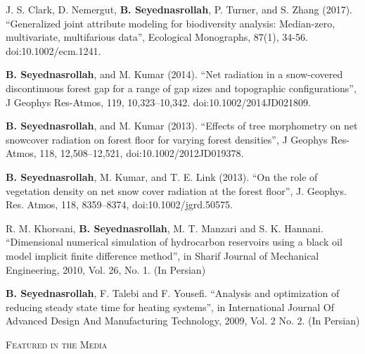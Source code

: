 \documentclass[10pt]{article}
\newenvironment{changemargin}[2]{%
  \begin{list}{}{%
    \setlength{\topsep}{0pt}%
    \setlength{\leftmargin}{#1}%
    \setlength{\rightmargin}{#2}%
    \setlength{\listparindent}{\parindent}%
    \setlength{\itemindent}{\parindent}%
    \setlength{\parsep}{\parskip}%
  }%
  \item[]}{\end{list}
}
\newcommand{\lineover}{
	\begin{changemargin}{-0.05in}{-0.05in}
		\vspace*{-8pt}
		\hrulefill \\
		\vspace*{-2pt}
	\end{changemargin}
}
\newcommand{\header}[1]{
	\begin{changemargin}{-0.5in}{-0.5in}
		\scshape{#1}\\
  	\lineover
	\end{changemargin}
}
\newenvironment{body} {
	\vspace*{-2pt}
	\begin{changemargin}{-0.5in}{-0.5in}
  }
	{\end{changemargin}
}
\begin{document}
\begin{body}
	J. S. Clark, D. Nemergut, \textbf{B. Seyednasrollah}, P. Turner, and S. Zhang (2017). ``Generalized joint attribute modeling for biodiversity analysis: Median-zero, multivariate, multifarious data'', Ecological Monographs, 87(1), 34-56. doi:10.1002/ecm.1241.\\
\medskip

	\textbf{B. Seyednasrollah}, and M. Kumar (2014). ``Net radiation in a snow-covered discontinuous forest gap for a range of gap sizes and topographic configurations'', J Geophys Res-Atmos, 119, 10,323–10,342. doi:10.1002/2014JD021809. \\
\medskip

	\textbf{B. Seyednasrollah}, and M. Kumar (2013). ``Effects of tree morphometry on net snowcover radiation on forest floor for varying forest densities'', J Geophys Res-Atmos, 118, 12,508–12,521, doi:10.1002/2012JD019378.\\
\medskip

	\textbf{B. Seyednasrollah}, M. Kumar, and T. E. Link (2013). ``On the role of vegetation density on net snow cover radiation at the forest floor'', J. Geophys. Res. Atmos, 118, 8359–8374, doi:10.1002/jgrd.50575.\\
\medskip

R. M. Khorsani, \textbf{B. Seyednasrollah}, M. T. Manzari and S. K. Hannani. ``Dimensional numerical simulation of hydrocarbon reservoirs using a black oil model implicit finite difference method'', in Sharif Journal of Mechanical Engineering, 2010, Vol. 26, No. 1. (In Persian)\\
\medskip

	 \textbf{B. Seyednasrollah}, F. Talebi and F. Yousefi. ``Analysis and optimization of reducing steady state time for heating systems'', in International Journal Of Advanced Design And Manufacturing Technology, 2009, Vol. 2 No. 2.  (In Persian)\\
\medskip


\end{body}

\medskip


\header{Featured in the Media}
\end{document}
